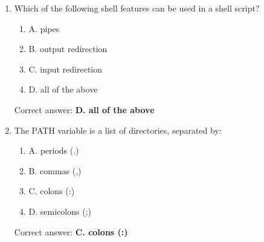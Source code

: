 \documentclass{article}
\begin{document}
\begin{enumerate}
    \item Which of the following shell features can be used in a shell script?
    \begin{enumerate}
        \item A. pipes
        \item B. output redirection
        \item C. input redirection
        \item D. all of the above
    \end{enumerate}
    Correct answer: \textbf{D. all of the above}

    \item The PATH variable is a list of directories, separated by:
    \begin{enumerate}
        \item A. periods (.)
        \item B. commas (,)
        \item C. colons (:)
        \item D. semicolons (;)
    \end{enumerate}
    Correct answer: \textbf{C. colons (:)}
\end{enumerate}
\end{document}
